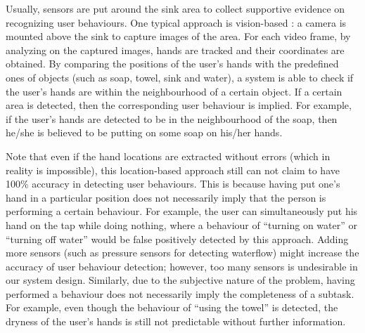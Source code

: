 Usually, sensors are put around the sink area to collect supportive evidence on recognizing user behaviours. One typical approach is vision-based \cite{hoey2006tracking, mihailidis2004use, czarnuch2014}: a camera is mounted above the sink to capture images of the area. For each video frame, by analyzing on the captured images, hands are tracked and their coordinates are obtained. By comparing the positions of the user's hands with the predefined ones of objects (such as soap, towel, sink and water), a system is able to check if the user's hands are within the neighbourhood of a certain object. If a certain area is detected, then the corresponding user behaviour is implied. For example, if the user's hands are detected to be in the neighbourhood of the soap, then he/she is believed to be putting on some soap on his/her hands. 

Note that even if the hand locations are extracted without errors (which in reality is impossible), this location-based approach still can not claim to have 100\% accuracy in detecting user behaviours. This is because having put one's hand in a particular position does not necessarily imply that the person is performing a certain behaviour. For example, the user can simultaneously put his hand on the tap while doing nothing, where a behaviour of ``turning on water'' or ``turning off water'' would be false positively detected by this approach. Adding more sensors (such as pressure sensors for detecting waterflow) might increase the accuracy of user behaviour detection; however, too many sensors is undesirable in our system design. Similarly, due to the subjective nature of the problem, having performed a behaviour does not necessarily imply the completeness of a subtask. For example, even though the behaviour of ``using the towel'' is detected, the dryness of the user's hands is still not predictable without further information. 

